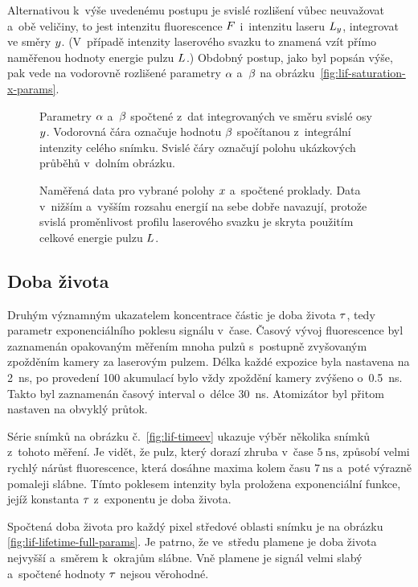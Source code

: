 Alternativou k~výše uvedenému postupu je svislé rozlišení vůbec neuvažovat
a~obě veličiny, to jest intenzitu fluorescence $F$ i~intenzitu
laseru $L_y$, integrovat ve směry $y$.
(V~případě intenzity laserového svazku to znamená vzít přímo
naměřenou hodnoty energie pulzu $L$.)
Obdobný postup, jako byl popsán výše, pak vede na vodorovně rozlišené
parametry $\alpha$ a~$\beta$ na obrázku~\ref{fig:lif-saturation-x-params}.

\begin{figure}[htp]
	\centering
	\small
	
	\caption{Parametry $\alpha$ a~$\beta$ spočtené z~dat integrovaných
		ve směru svislé osy $y$.
		Vodorovná čára označuje hodnotu $\beta$ spočítanou z~integrální
		intenzity celého snímku.
		Svislé čáry označují polohu ukázkových průběhů v~dolním obrázku.}
	\label{fig:lif-saturation-x-params}
	\bigskip
	
	\caption{Naměřená data pro vybrané polohy $x$ a~spočtené proklady.
		Data v~nižším a~vyšším rozsahu energií na sebe dobře navazují,
		protože svislá proměnlivost profilu laserového svazku je skryta
		použitím celkové energie pulzu $L$.}
	\label{fig:lif-saturation-x-fits}
\end{figure}

\subsection{Doba života}
\label{sec:lif-lifetime}
Druhým významným ukazatelem koncentrace částic je doba života $\tau$,
tedy parametr exponenciálního poklesu signálu v~čase.
Časový vývoj fluorescence byl zaznamenán opakovaným měřením mnoha pulzů
s~postupně zvyšovaným zpožděním kamery za laserovým pulzem.
Délka každé expozice byla nastavena na \SI{2}{\nano\second},
po provedení 100 akumulací bylo vždy zpoždění kamery zvýšeno
o~\SI{0.5}{\nano\second}.
Takto byl zaznamenán časový interval o~délce \SI{30}{\nano\second}.
Atomizátor byl přitom nastaven na obvyklý průtok.

Série snímků na obrázku č.~\ref{fig:lif-timeev} ukazuje výběr několika
snímků z~tohoto měření.
Je vidět, že pulz, který dorazí zhruba v~čase $\SI{5}{\nano\second}$,
způsobí velmi rychlý nárůst fluorescence, která dosáhne maxima kolem
času $\SI{7}{\nano\second}$ a~poté výrazně pomaleji slábne.
Tímto poklesem intenzity byla proložena exponenciální funkce,
jejíž konstanta $\tau$ z~exponentu je doba života.

Spočtená doba života pro každý pixel středové oblasti snímku je
na obrázku \ref{fig:lif-lifetime-full-params}.
Je patrno, že ve~středu plamene je doba života nejvyšší
a~směrem k~okrajům slábne.
Vně plamene je signál velmi slabý a~spočtené hodnoty $\tau$
nejsou věrohodné.

